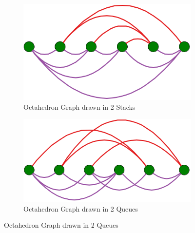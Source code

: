 \documentclass[bachelor, english]{algothesis}
\begin{document}
\begin{figure}[ht]
    \centering

    \begin{subfigure}[b]{0.45\linewidth}
        \includegraphics[width=\linewidth]{figures/octahedron_stack.png}
        \caption{Octahedron Graph drawn in 2 Stacks}
        \label{fig:octahedron_stack}
    \end{subfigure}
    \hfill
    \begin{subfigure}[b]{0.45\linewidth}
        \includegraphics[width=\linewidth]{figures/octahedron_queue.png}
        \caption{Octahedron Graph drawn in 2 Queues}
        \label{fig:octahedron_queue}
    \end{subfigure}


\end{figure}
\end{document}
